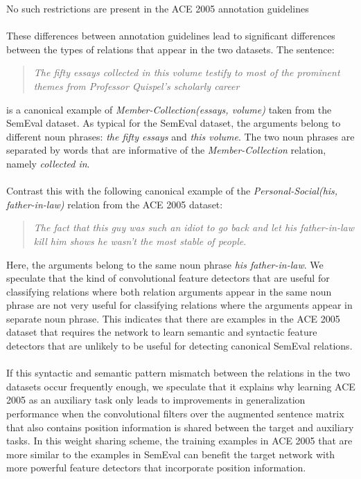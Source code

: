 No such restrictions are present in the ACE 2005 annotation guidelines
\\\\
These differences between annotation guidelines lead to significant differences between the types of relations that appear in the two datasets. The sentence: 
\begin{quote}
\textit{The fifty essays collected in this volume testify to most of the prominent themes from Professor Quispel's scholarly career}	
\end{quote}
\noindent
is a canonical example of \textit{Member-Collection(essays, volume)} taken from the SemEval dataset. As typical for the SemEval dataset, the arguments belong to different noun phrases: \textit{the fifty essays} and \textit{this volume}. The two noun phrases are separated by words that are informative of the \textit{Member-Collection} relation, namely \textit{collected in}.
\\\\
Contrast this with the following canonical example of the \textit{Personal-Social(his, father-in-law)} relation from the ACE 2005 dataset: 
\begin{quote}
\textit{The fact that this guy was such an idiot to go back and let his father-in-law kill him shows he wasn't the most stable of people}.	
\end{quote}
 Here, the arguments belong to the same noun phrase \textit{his father-in-law}. We speculate that the kind of convolutional feature detectors that are useful for classifying relations where both relation arguments appear in the same noun phrase are not very useful for classifying relations where the arguments appear in separate noun phrase. This indicates that there are examples in the ACE 2005 dataset that requires the network to learn semantic and syntactic feature detectors that are unlikely to be useful for detecting canonical SemEval relations.
\\\\
If this syntactic and semantic pattern mismatch between the relations in the two datasets occur frequently enough, we speculate that it explains why learning ACE 2005 as an auxiliary task only leads to improvements in generalization performance when the convolutional filters over the augmented sentence matrix that also contains position information is shared between the target and auxiliary tasks. In this weight sharing scheme, the training examples in ACE 2005 that are more similar to the examples in SemEval can benefit the target network with more powerful feature detectors that incorporate position information.
